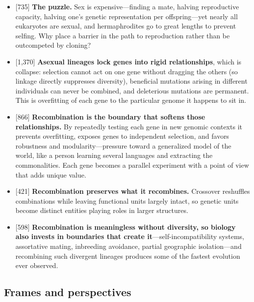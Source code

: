 \documentclass[11pt]{article}
\newcommand{\ct}[1]{{\footnotesize\color{black!55}[#1]}\hspace{1pt}}
\begin{document}
\begin{itemize}
  \item \ct{735} \textbf{The puzzle.} Sex is expensive---finding a mate, halving reproductive capacity, halving one's genetic representation per offspring---yet nearly all eukaryotes are sexual, and hermaphrodites go to great lengths to prevent selfing. Why place a barrier in the path to reproduction rather than be outcompeted by cloning?
  \item \ct{1,370} \textbf{Asexual lineages lock genes into rigid relationships}, which is collapse: selection cannot act on one gene without dragging the others (so linkage directly suppresses diversity), beneficial mutations arising in different individuals can never be combined, and deleterious mutations are permanent. This is overfitting of each gene to the particular genome it happens to sit in.
  \item \ct{866} \textbf{Recombination is the boundary that softens those relationships.} By repeatedly testing each gene in new genomic contexts it prevents overfitting, exposes genes to independent selection, and favors robustness and modularity---pressure toward a generalized model of the world, like a person learning several languages and extracting the commonalities. Each gene becomes a parallel experiment with a point of view that adds unique value.
  \item \ct{421} \textbf{Recombination preserves what it recombines.} Crossover reshuffles combinations while leaving functional units largely intact, so genetic units become distinct entities playing roles in larger structures.
  \item \ct{598} \textbf{Recombination is meaningless without diversity, so biology also invests in boundaries that create it}---self-incompatibility systems, assortative mating, inbreeding avoidance, partial geographic isolation---and recombining such divergent lineages produces some of the fastest evolution ever observed.
\end{itemize}

\subsection{Frames and perspectives}
\end{document}
